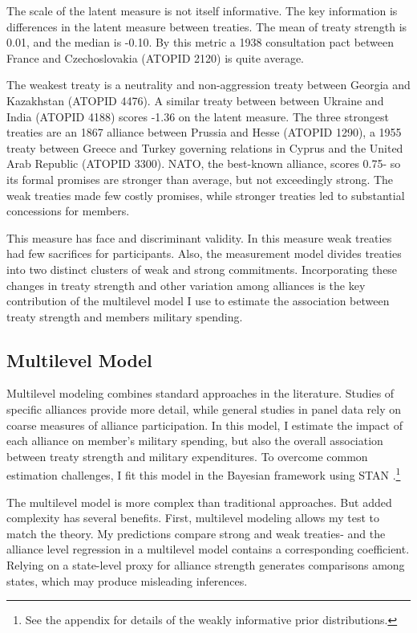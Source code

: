 \documentclass[12pt]{article}
\begin{document}
The scale of the latent measure is not itself informative. 
The key information is differences in the latent measure between treaties. 
The mean of treaty strength is 0.01, and the median is -0.10. 
By this metric a 1938 consultation pact between France and Czechoslovakia (ATOPID 2120) is quite average. 


The weakest treaty is a neutrality and non-aggression treaty between Georgia and Kazakhstan (ATOPID 4476).  
A similar treaty between between Ukraine and India (ATOPID 4188) scores -1.36 on the latent measure.
The three strongest treaties are an 1867 alliance between Prussia and Hesse (ATOPID 1290), a 1955 treaty between Greece and Turkey governing relations in Cyprus and the United Arab Republic (ATOPID 3300).  
NATO, the best-known alliance, scores 0.75- so its formal promises are stronger than average, but not exceedingly strong. 
The weak treaties made few costly promises, while stronger treaties led to substantial concessions for members. 


This measure has face and discriminant validity. 
In this measure weak treaties had few sacrifices for participants. 
Also, the measurement model divides treaties into two distinct clusters of weak and strong commitments. 
Incorporating these changes in treaty strength and other variation among alliances is the key contribution of the multilevel model I use to estimate the association between treaty strength and members military spending.  


\subsection{Multilevel Model} 


Multilevel modeling combines standard approaches in the literature. 
Studies of specific alliances provide more detail, while general studies in panel data rely on coarse measures of alliance participation.
In this model, I estimate the impact of each alliance on member's military spending, but also the overall association between treaty strength and military expenditures. 
To overcome common estimation challenges, I fit this model in the Bayesian framework using STAN \citep{Carpenteretal2016}.\footnote{See the appendix for details of the weakly informative prior distributions.}


The multilevel model is more complex than traditional approaches. 
But added complexity has several benefits. 
First, multilevel modeling allows my test to match the theory. 
My predictions compare strong and weak treaties- and the alliance level regression in a multilevel model contains a corresponding coefficient.
Relying on a state-level proxy for alliance strength generates comparisons among states, which may produce misleading inferences. 
\end{document}

